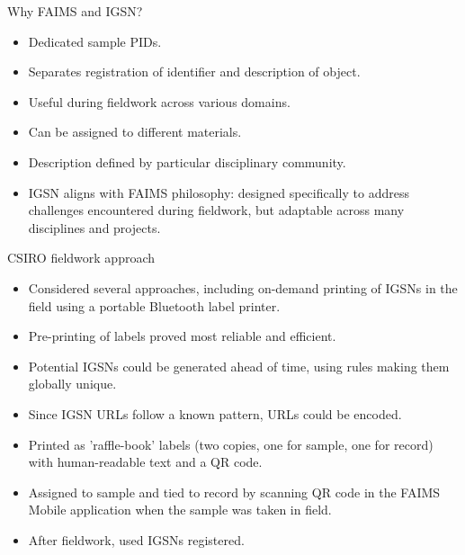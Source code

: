 \begin{frame}{Why FAIMS and IGSN?}
    \begin{itemize}
        \item Dedicated sample PIDs.
        \item Separates registration of identifier and description of object.
        \item Useful during fieldwork across various domains.
        \item Can be assigned to different materials.
        \item Description defined by particular disciplinary community.
        \item IGSN aligns with FAIMS philosophy: designed specifically to address challenges encountered during fieldwork, but adaptable across many disciplines and projects.
    \end{itemize}
\end{frame}

\begin{frame}{CSIRO fieldwork approach}
    \begin{itemize}
        \item Considered several approaches, including on-demand printing of IGSNs in the field using a portable Bluetooth label printer.
        \item Pre-printing of labels proved most reliable and efficient.
        \item Potential IGSNs could be generated ahead of time, using rules making them globally unique.
        \item Since IGSN URLs follow a known pattern, URLs could be encoded.
        \item Printed as 'raffle-book' labels (two copies, one for sample, one for record) with human-readable text and a QR code.
        \item Assigned to sample and tied to record by scanning QR code in the FAIMS Mobile application when the sample was taken in field.
        \item After fieldwork, used IGSNs registered.
    \end{itemize}
\end{frame}



